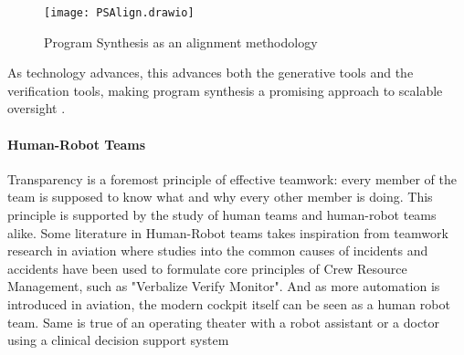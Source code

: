 \begin{figure}
    \centering
    \texttt{[image: PSAlign.drawio]}
    \caption{Program Synthesis as an alignment methodology}
    \label{fig:ps-as-alignment}
\end{figure}

As technology advances, this advances both the generative tools and the verification tools, making program synthesis a promising approach to scalable oversight \cite[sec. 5]{amodeiConcreteProblemsAI2016}.

\paragraph{Human-Robot Teams}

Transparency is a foremost principle of effective teamwork: every member of the team is supposed to know what and why every other member is doing. 
This principle is supported by the study of human teams \cite{bagPeerTransparencyTeams2012, solomonInferenceTransparencyEffective2021} and human-robot teams \cite{ezenyilimbaImpactTransparencyExplanations2022, guznovRobotTransparencyTeam2019, holderDesigningBiDirectionalTransparency2021, lakhmaniExploringEffectCommunication2019, lakhmaniProposedApproachDetermining2016, mercadoIntelligentAgentTransparency2016, ososkyDeterminantsSystemTransparency2014, panganibanTransparencyAutonomousTeammates2020, ronconeTransparentRoleAssignment2017} alike.
Some literature in Human-Robot teams takes inspiration \cite{shivelyCrewResourceManagement2018} from teamwork research in aviation where studies into the common causes of incidents and accidents \cite{chidesterPersonalityFactorsFlight1990, chidesterPilotPersonalityCrew1991, smithSimulatorStudyInteraction1979} have been used to formulate core principles of Crew Resource Management, such as "Verbalize Verify Monitor".
And as more automation is introduced in aviation, the modern cockpit itself can be seen as a human robot team.
Same is true of an operating theater with a robot assistant \cite{weerarathnaHumanRobotCollaborationHealthcare2023} or a doctor using a clinical decision support system \cite{castilloConsiderationsSuccessfulClinical2013, mooreIntroductionClinicalDecision2011, osullivanDecisionTimeClinical2014, purcellWhatMakesGood2005, sakallarisClinicalDecisionSupport2000, selfClinicalDecisionSupport2008, stangeThisIssueClinical2011, wrightClinicalDecisionSupport2009}

